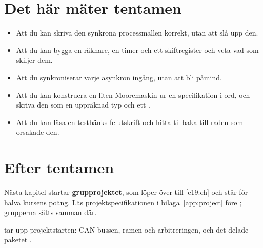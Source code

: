 \section{Det här mäter tentamen}
\label{c9:sec:measures}

\begin{itemize}
  \item Att du kan skriva den synkrona processmallen korrekt, utan att slå upp den.
  \item Att du kan bygga en räknare, en timer och ett skiftregister och veta vad som skiljer dem.
  \item Att du synkroniserar varje asynkron ingång, utan att bli påmind.
  \item Att du kan konstruera en liten Mooremaskin ur en specifikation i ord, och skriva den som en
    uppräknad typ och ett .
  \item Att du kan läsa en testbänks felutskrift och hitta tillbaka till raden som orsakade den.
\end{itemize}

\section{Efter tentamen}
\label{c9:sec:after}

Nästa kapitel startar \textbf{grupprojektet}, som löper över  till \ref{c19:ch} och
står för halva kursens poäng. Läs projektspecifikationen i bilaga~\ref{app:project} före
; grupperna sätts samman där.

 tar upp projektstarten: CAN-bussen, ramen och arbitreringen, och det delade paketet
.
